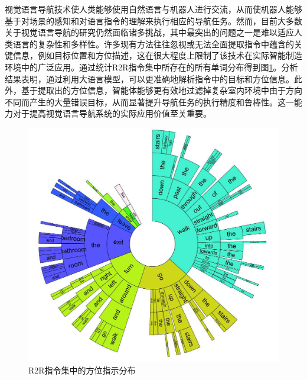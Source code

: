 视觉语言导航技术使人类能够使用自然语言与机器人进行交流，从而使机器人能够基于对场景的感知和对语言指令的理解来执行相应的导航任务。然而，目前大多数关于视觉语言导航的研究仍然面临诸多挑战，其中最突出的问题之一是难以适应人类语言的复杂性和多样性。许多现有方法往往忽视或无法全面提取指令中蕴含的关键信息，例如目标位置和方位描述，这在很大程度上限制了该技术在实际智能制造环境中的广泛应用。通过统计R2R指令集中所存在的所有单词分布得到图\ref{instruction_words}。分析结果表明，通过利用大语言模型，可以更准确地解析指令中的目标和方位信息。此外，基于提取出的方位信息，智能体能够更有效地过滤掉复杂室内环境中由于方向不同而产生的大量错误目标，从而显著提升导航任务的执行精度和鲁棒性。这一能力对于提高视觉语言导航系统的实际应用价值至关重要。
\begin{figure}[htbp]
    \centering
    \includegraphics[scale=0.55]{Fig/instruction_words.png}
    \caption{\label{instruction_words}R2R指令集中的方位指示分布}
\end{figure}

